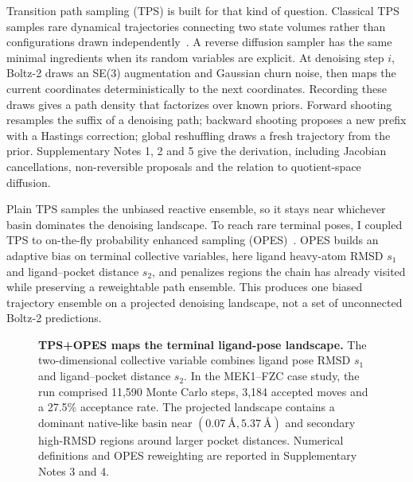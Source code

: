\documentclass[aps,prl,twocolumn,superscriptaddress,floatfix]{revtex4-2}
\begin{document}
Transition path sampling (TPS) is built for that kind of question. Classical
TPS samples rare dynamical trajectories connecting two state volumes rather
than configurations drawn independently~\cite{dellago1998,bolhuis2002}. A
reverse diffusion sampler has the same minimal ingredients when its random
variables are explicit. At denoising step $i$, Boltz-2 draws an SE(3)
augmentation and Gaussian churn noise, then maps the current coordinates
deterministically to the next coordinates. Recording these draws gives a path
density that factorizes over known priors. Forward shooting resamples the
suffix of a denoising path; backward shooting proposes a new prefix with a
Hastings correction; global reshuffling draws a fresh trajectory from the
prior. Supplementary Notes 1, 2 and 5 give the derivation, including Jacobian
cancellations, non-reversible proposals and the relation to quotient-space
diffusion.

Plain TPS samples the unbiased reactive ensemble, so it stays near whichever
basin dominates the denoising landscape. To reach rare terminal poses, I
coupled TPS to on-the-fly probability enhanced sampling
(OPES)~\cite{invernizzi2020,invernizzi2022}. OPES builds an adaptive bias on
terminal collective variables, here ligand heavy-atom RMSD $s_1$ and
ligand--pocket distance $s_2$, and penalizes regions the chain has already
visited while preserving a reweightable path ensemble. This produces one
biased trajectory ensemble on a projected denoising landscape, not a set of
unconnected Boltz-2 predictions.

\begin{figure}[t]
\centering
{}
\caption{\textbf{TPS+OPES maps the terminal ligand-pose landscape.}
The two-dimensional collective variable combines ligand pose RMSD $s_1$ and
ligand--pocket distance $s_2$. In the MEK1--FZC case study, the run comprised
11,590 Monte Carlo steps, 3,184 accepted moves and a 27.5\% acceptance rate.
The projected landscape contains a dominant native-like basin near
$(0.07~\text{\AA}, 5.37~\text{\AA})$ and secondary high-RMSD regions
around larger pocket distances. Numerical definitions and OPES reweighting are
reported in Supplementary Notes 3 and 4.}
\label{fig:landscape}
\end{figure}
\end{document}
